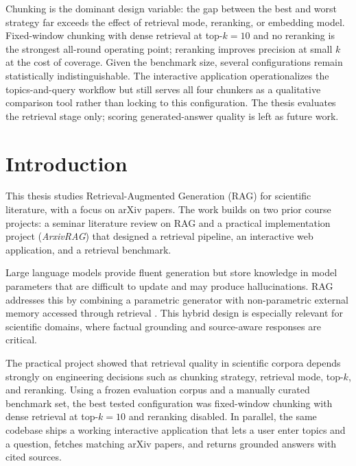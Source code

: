 \documentclass[12pt,a4paper,titlepage,oneside]{book}
\begin{document}
Chunking is the dominant design variable: the gap between the best and worst strategy far exceeds the effect of retrieval mode, reranking, or embedding model. Fixed-window chunking with dense retrieval at top-$k=10$ and no reranking is the strongest all-round operating point; reranking improves precision at small $k$ at the cost of coverage. Given the benchmark size, several configurations remain statistically indistinguishable. The interactive application operationalizes the topics-and-query workflow but still serves all four chunkers as a qualitative comparison tool rather than locking to this configuration. The thesis evaluates the retrieval stage only; scoring generated-answer quality is left as future work.
\clearpage

\tableofcontents
\clearpage

\listoftables
\clearpage

\listoffigures
\clearpage

\chapter{Introduction}

This thesis studies Retrieval-Augmented Generation (RAG) for scientific literature, with a focus on arXiv papers. The work builds on two prior course projects: a seminar literature review on RAG and a practical implementation project (\textit{ArxivRAG}) that designed a retrieval pipeline, an interactive web application, and a retrieval benchmark.

Large language models provide fluent generation but store knowledge in model parameters that are difficult to update and may produce hallucinations. RAG addresses this by combining a parametric generator with non-parametric external memory accessed through retrieval \cite{lewis2020rag}. This hybrid design is especially relevant for scientific domains, where factual grounding and source-aware responses are critical.

The practical project showed that retrieval quality in scientific corpora depends strongly on engineering decisions such as chunking strategy, retrieval mode, top-$k$, and reranking. Using a frozen evaluation corpus and a manually curated benchmark set, the best tested configuration was fixed-window chunking with dense retrieval at top-$k=10$ and reranking disabled. In parallel, the same codebase ships a working interactive application that lets a user enter topics and a question, fetches matching arXiv papers, and returns grounded answers with cited sources.
\end{document}
